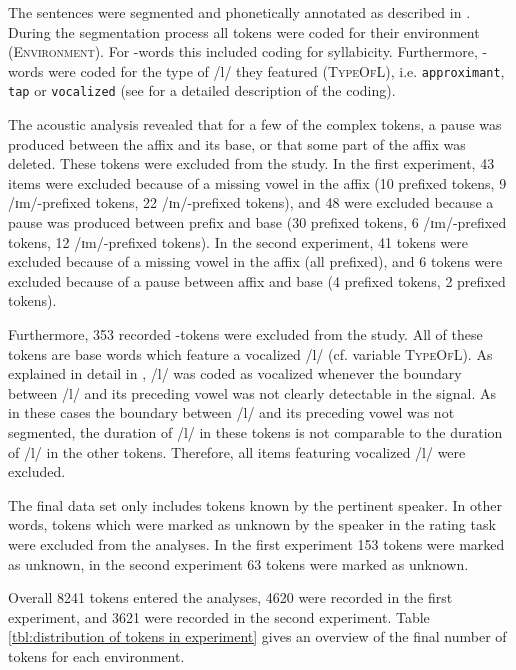 The sentences were segmented and phonetically annotated as described in . 
During the segmentation process all tokens were coded for their environment (\textsc{Environment}). For -words this included coding for syllabicity. Furthermore, -words were coded for the type of /l/ they featured (\textsc{TypeOfL}), i.e. \texttt{approximant}, \texttt{tap} or \texttt{vocalized} (see  for a detailed description of the coding).


 The acoustic analysis revealed that for a few of the complex tokens, a pause was produced between the affix and its base, or that some part of the affix was deleted. These tokens were excluded from the study. 
 In the first experiment, 43 items were excluded because of a missing vowel in the affix  (10  prefixed tokens,  9 /ɪm/-prefixed tokens, 22 /ɪn/-prefixed tokens), and 48 were excluded because a pause was produced between prefix and base (30  prefixed tokens,  6 /ɪm/-prefixed tokens, 12 /ɪm/-prefixed tokens). 
 In the second experiment, 41 tokens were excluded because of a missing vowel in the affix (all prefixed), and 6 tokens were excluded because of a pause between affix and base (4 prefixed tokens, 2 prefixed tokens). %


Furthermore, 353 recorded -tokens were excluded from the study. %
All of these tokens are base words which feature a vocalized /l/ (cf. variable \textsc{TypeOfL}). As explained in detail in , /l/ was coded as vocalized whenever the boundary between /l/ and its preceding vowel was not clearly detectable in the signal. As in these cases the boundary between /l/ and its preceding vowel was not segmented, 
the duration of /l/ in these tokens is not comparable to the duration of /l/ in the other tokens. Therefore, all items featuring vocalized /l/ were excluded.



 The final data set only includes tokens known by the pertinent speaker. In other words, tokens which were marked as unknown by the speaker in the rating task were excluded from the analyses. In the first experiment 153 tokens were marked as unknown, in the second experiment 63 tokens were marked as unknown.
 
 Overall 8241 tokens entered the analyses, 4620 were recorded in the first experiment, and  3621 were recorded in the second experiment. Table \ref{tbl:distribution of tokens in experiment} gives an overview of the final number of tokens for each environment. 
  

